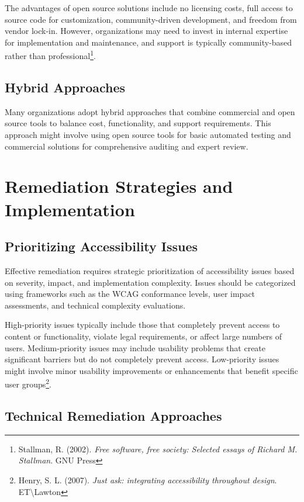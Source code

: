 The advantages of open source solutions include no licensing costs, full access to source code for customization, community-driven development, and freedom from vendor lock-in. However, organizations may need to invest in internal expertise for implementation and maintenance, and support is typically community-based rather than professional\footnote{Stallman, R. (2002). \textit{Free software, free society: Selected essays of Richard M. Stallman}. GNU Press}.

\subsection{Hybrid Approaches}

Many organizations adopt hybrid approaches that combine commercial and open source tools to balance cost, functionality, and support requirements. This approach might involve using open source tools for basic automated testing and commercial solutions for comprehensive auditing and expert review.

\section{Remediation Strategies and Implementation}\label{sec:remediation-implementation}

\subsection{Prioritizing Accessibility Issues}

Effective remediation requires strategic prioritization of accessibility issues based on severity, impact, and implementation complexity. Issues should be categorized using frameworks such as the WCAG conformance levels, user impact assessments, and technical complexity evaluations.

High-priority issues typically include those that completely prevent access to content or functionality, violate legal requirements, or affect large numbers of users. Medium-priority issues may include usability problems that create significant barriers but do not completely prevent access. Low-priority issues might involve minor usability improvements or enhancements that benefit specific user groups\footnote{Henry, S. L. (2007). \textit{Just ask: integrating accessibility throughout design}. ET\textbackslash Lawton}.

\subsection{Technical Remediation Approaches}


